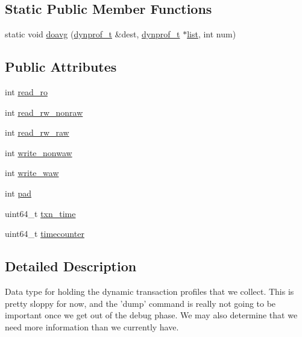 \subsection*{Static Public Member Functions}
\begin{DoxyCompactItemize}
\item 
static void \hyperlink{structstm_1_1dynprof__t_a2b3bf61e8cd914963dc3ff653ec2f6bc}{doavg} (\hyperlink{structstm_1_1dynprof__t}{dynprof\-\_\-t} \&dest, \hyperlink{structstm_1_1dynprof__t}{dynprof\-\_\-t} $\ast$\hyperlink{structlist}{list}, int num)
\end{DoxyCompactItemize}
\subsection*{Public Attributes}
\begin{DoxyCompactItemize}
\item 
int \hyperlink{structstm_1_1dynprof__t_af1e78f3394edfbf9de5699112c41cea4}{read\-\_\-ro}
\item 
int \hyperlink{structstm_1_1dynprof__t_a0a198a899b311419f63ab993e0afeeaf}{read\-\_\-rw\-\_\-nonraw}
\item 
int \hyperlink{structstm_1_1dynprof__t_ab1c13f6928a4d9037a768e3df8dc5f40}{read\-\_\-rw\-\_\-raw}
\item 
int \hyperlink{structstm_1_1dynprof__t_aa8824b4a711da2929d1065d7f7f005fa}{write\-\_\-nonwaw}
\item 
int \hyperlink{structstm_1_1dynprof__t_a9365e2a5faf3ac711df3ea74c522d5db}{write\-\_\-waw}
\item 
int \hyperlink{structstm_1_1dynprof__t_ad447eb05504a614fbcc966d02534aec5}{pad}
\item 
uint64\-\_\-t \hyperlink{structstm_1_1dynprof__t_ac21d53f32c09ea9a58cd389d7cf7f102}{txn\-\_\-time}
\item 
uint64\-\_\-t \hyperlink{structstm_1_1dynprof__t_a146c7efc1729bd2dc3f682da5506672d}{timecounter}
\end{DoxyCompactItemize}


\subsection{Detailed Description}
Data type for holding the dynamic transaction profiles that we collect. This is pretty sloppy for now, and the 'dump' command is really not going to be important once we get out of the debug phase. We may also determine that we need more information than we currently have. 

